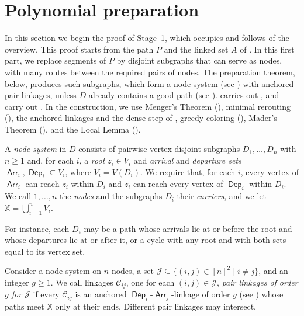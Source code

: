 \documentclass[fontsize=12pt,leading=14pt]{fullpaper}
\DeclareMathOperator{\Arr}{\mathsf{Arr}}
\DeclareMathOperator{\Dep}{\mathsf{Dep}}
\newcommand{\Ccal}{\mathcal{C}}
\newcommand{\Jcal}{\mathcal{J}}
\newcommand{\XX}{\mathbb{X}}
\newcounter{step}
\begin{document}
%
\section{Polynomial preparation}\label{sec:prep}

In this section we begin the proof of Stage~1, which occupies  and follows  of the overview.
This proof starts from the path $P$ and the linked set $A$ of .
In this first part, we replace segments of $P$ by disjoint subgraphs that can serve as nodes, with many routes between the required pairs of nodes.
The preparation theorem,  below, produces such subgraphs, which form a node system (see ) with anchored pair linkages, unless $D$ already contains a good path (see ).
 carries out , and  carry out .
In the construction, we use Menger's Theorem (), minimal rerouting (), the anchored linkages and the dense step of , greedy coloring (), Mader's Theorem (), and the Local Lemma ().

\begin{definition}\label{def:node-system}
  A \emph{node system} in $D$ consists of pairwise vertex-disjoint subgraphs $D_1,\dots,D_n$ with $n\ge1$ and, for each $i$, a \emph{root} $z_i\in V_i$ and \emph{arrival} and \emph{departure sets} $\Arr_i,\Dep_i\subseteq V_i$, where $V_i=V(D_i)$.
  We require that, for each $i$, every vertex of $\Arr_i$ can reach $z_i$ within $D_i$ and $z_i$ can reach every vertex of $\Dep_i$ within $D_i$.
  We call $1,\dots,n$ the \emph{nodes} and the subgraphs $D_i$ their \emph{carriers}, and we let $\XX=\bigcup_{i=1}^n V_i$.
\end{definition}

For instance, each $D_i$ may be a path whose arrivals lie at or before the root and whose departures lie at or after it, or a cycle with any root and with both sets equal to its vertex set.

Consider a node system on $n$ nodes, a set $\Jcal\subseteq\{(i,j)\in[n]^2\mid i\ne j\}$, and an integer $g\ge1$.
We call linkages $\Ccal_{ij}$, one for each $(i,j)\in\Jcal$, \emph{pair linkages of order $g$ for $\Jcal$} if every $\Ccal_{ij}$ is an anchored $\Dep_i$-$\Arr_j$-linkage of order $g$ (see ) whose paths meet $\XX$ only at their ends.
Different pair linkages may intersect.
\end{document}
